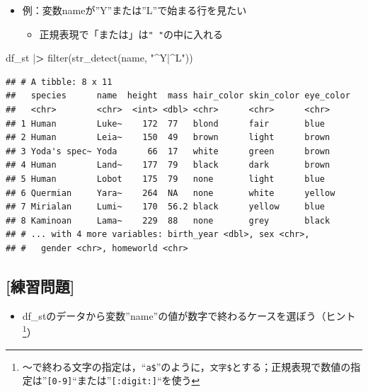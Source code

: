 \documentclass[
  xelatex,ja=standard, b5paper]{bxjsbook}
\newenvironment{Shaded}{\begin{snugshade}}{\end{snugshade}}
\newcommand{\ErrorTok}[1]{\textcolor[rgb]{0.64,0.00,0.00}{\textbf{#1}}}
\newcommand{\FunctionTok}[1]{\textcolor[rgb]{0.00,0.00,0.00}{#1}}
\newcommand{\NormalTok}[1]{#1}
\newcommand{\SpecialCharTok}[1]{\textcolor[rgb]{0.00,0.00,0.00}{#1}}
\newcommand{\StringTok}[1]{\textcolor[rgb]{0.31,0.60,0.02}{#1}}
\providecommand{\tightlist}{%
  \setlength{\itemsep}{0pt}\setlength{\parskip}{0pt}}
\begin{document}
\begin{itemize}
\tightlist
\item
  例：変数nameが''Y''または''L''で始まる行を見たい

  \begin{itemize}
  \tightlist
  \item
    正規表現で「または」は\texttt{"\ "}の中に入れる
  \end{itemize}
\end{itemize}

\begin{Shaded}
\begin{Highlighting}[]
\NormalTok{df\_st }\SpecialCharTok{|}\ErrorTok{\textgreater{}}
  \FunctionTok{filter}\NormalTok{(}\FunctionTok{str\_detect}\NormalTok{(name, }\StringTok{"\^{}Y|\^{}L"}\NormalTok{))}
\end{Highlighting}
\end{Shaded}

\begin{verbatim}
## # A tibble: 8 x 11
##   species      name  height  mass hair_color skin_color eye_color
##   <chr>        <chr>  <int> <dbl> <chr>      <chr>      <chr>    
## 1 Human        Luke~    172  77   blond      fair       blue     
## 2 Human        Leia~    150  49   brown      light      brown    
## 3 Yoda's spec~ Yoda      66  17   white      green      brown    
## 4 Human        Land~    177  79   black      dark       brown    
## 5 Human        Lobot    175  79   none       light      blue     
## 6 Quermian     Yara~    264  NA   none       white      yellow   
## 7 Mirialan     Lumi~    170  56.2 black      yellow     blue     
## 8 Kaminoan     Lama~    229  88   none       grey       black    
## # ... with 4 more variables: birth_year <dbl>, sex <chr>,
## #   gender <chr>, homeworld <chr>
\end{verbatim}

\hypertarget{ux7df4ux7fd2ux554fux984c-8}{%
\subsection{{[}練習問題{]}}\label{ux7df4ux7fd2ux554fux984c-8}}

\begin{itemize}
\tightlist
\item
  df\_stのデータから変数''name''の値が数字で終わるケースを選ぼう（ヒント\footnote{～で終わる文字の指定は，``\texttt{a\$}''のように，\texttt{文字\$}とする；正規表現で数値の指定は''\texttt{{[}0-9{]}}``または''\texttt{{[}:digit:{]}}``を使う}）
\end{itemize}
\end{document}
